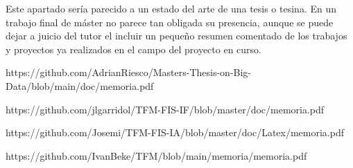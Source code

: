 
Este apartado sería parecido a un estado del arte de una tesis o tesina. En un trabajo final de máster no parece tan obligada su presencia, aunque se puede dejar a juicio del tutor el incluir un pequeño resumen comentado de los trabajos y proyectos ya realizados en el campo del proyecto en curso. 

https://github.com/AdrianRiesco/Masters-Thesis-on-Big-Data/blob/main/doc/memoria.pdf

https://github.com/jlgarridol/TFM-FIS-IF/blob/master/doc/memoria.pdf

https://github.com/Josemi/TFM-FIS-IA/blob/master/doc/Latex/memoria.pdf

https://github.com/IvanBeke/TFM/blob/main/memoria/memoria.pdf